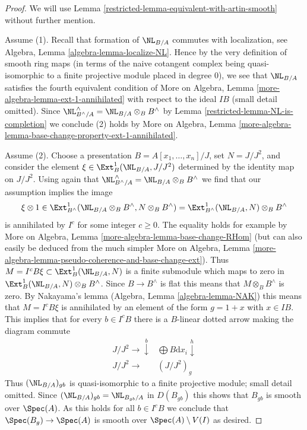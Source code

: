 \begin{proof}

We will use Lemma \ref{restricted-lemma-equivalent-with-artin-smooth}
without further mention.

\medskip\noindent
Assume (1). Recall that formation of $\NL_{B/A}$ commutes with
localization, see Algebra, Lemma \ref{algebra-lemma-localize-NL}.
Hence by the very definition of smooth ring maps (in terms of
the naive cotangent complex being quasi-isomorphic to a finite
projective module placed in degree $0$), we see that
$\NL_{B/A}$ satisfies the fourth equivalent condition
of More on Algebra, Lemma \ref{more-algebra-lemma-ext-1-annihilated}
with respect to the ideal $IB$ (small detail omitted).
Since $\NL_{B^\wedge/A}^\wedge = \NL_{B/A} \otimes_B B^\wedge$
by Lemma \ref{restricted-lemma-NL-is-completion} we conclude (2) holds by
More on Algebra, Lemma
\ref{more-algebra-lemma-base-change-property-ext-1-annihilated}.

\medskip\noindent
Assume (2). Choose a presentation
$B = A[x_1, \ldots, x_n]/J$, set $N = J/J^2$, and
consider the element $\xi \in \Ext^1_B(\NL_{B/A}, J/J^2)$
determined by the identity map on $J/J^2$.
Using again that $\NL_{B^\wedge/A}^\wedge = \NL_{B/A} \otimes_B B^\wedge$
we find that our assumption implies the image
$$
\xi \otimes 1 \in
\Ext^1_{B^\wedge}(\NL_{B/A} \otimes_B B^\wedge, N \otimes_B B^\wedge) =
\Ext^1_{B^\wedge}(\NL_{B/A}, N) \otimes_B B^\wedge
$$
is annihilated by $I^c$ for some integer $c \geq 0$.
The equality holds for example by
More on Algebra, Lemma \ref{more-algebra-lemma-base-change-RHom}
(but can also easily be deduced from the much simpler
More on Algebra, Lemma
\ref{more-algebra-lemma-pseudo-coherence-and-base-change-ext}).
Thus $M = I^cB\xi \subset \Ext^1_B(\NL_{B/A}, N)$ is a finite submodule
which maps to zero in $\Ext^1_B(\NL_{B/A}, N) \otimes_B B^\wedge$.
Since $B \to B^\wedge$ is flat this means that
$M \otimes_B B^\wedge$ is zero. By
Nakayama's lemma (Algebra, Lemma \ref{algebra-lemma-NAK})
this means that $M = I^cB\xi$ is annihilated by an element
of the form $g = 1 + x$ with $x \in IB$.
This implies that for every $b \in I^cB$ there is a
$B$-linear dotted arrow making the diagram commute
$$
\begin{array}{cc}J/J^2 \longrightarrow\overset{b}{\downarrow} & \bigoplus B\text{d}x_i \overset{h}{\downarrow} \\ J/J^2 \longrightarrow & (J/J^2)_g\end{array}
$$
Thus $(\NL_{B/A})_{gb}$ is quasi-isomorphic
to a finite projective module; small detail omitted.
Since $(\NL_{B/A})_{gb} = \NL_{B_{gb}/A}$ in $D(B_{gb})$
this shows that $B_{gb}$ is smooth over $\Spec(A)$.
As this holds for all $b \in I^cB$ we conclude
that $\Spec(B_g) \to \Spec(A)$ is smooth over $\Spec(A) \setminus V(I)$
as desired.
\end{proof}

